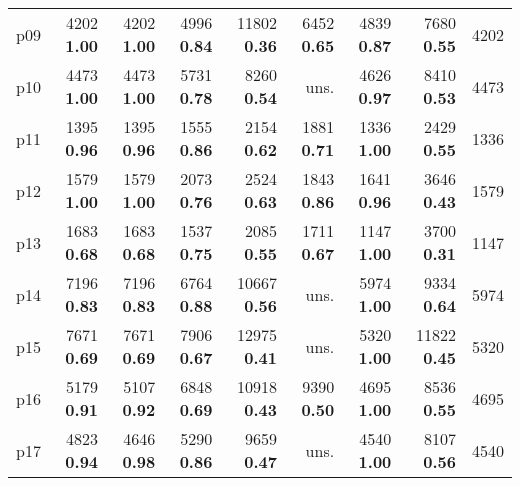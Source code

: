 \begin{tabular}{|l|rrrrrrr|r|}
p09 & {\footnotesize 4202} \textbf{1.00} & {\footnotesize 4202} \textbf{1.00} & {\footnotesize 4996} \textbf{0.84} & {\footnotesize 11802} \textbf{0.36} & {\footnotesize 6452} \textbf{0.65} & {\footnotesize 4839} \textbf{0.87} & {\footnotesize 7680} \textbf{0.55} & 4202\\
p10 & {\footnotesize 4473} \textbf{1.00} & {\footnotesize 4473} \textbf{1.00} & {\footnotesize 5731} \textbf{0.78} & {\footnotesize 8260} \textbf{0.54} & uns. & {\footnotesize 4626} \textbf{0.97} & {\footnotesize 8410} \textbf{0.53} & 4473\\
p11 & {\footnotesize 1395} \textbf{0.96} & {\footnotesize 1395} \textbf{0.96} & {\footnotesize 1555} \textbf{0.86} & {\footnotesize 2154} \textbf{0.62} & {\footnotesize 1881} \textbf{0.71} & {\footnotesize 1336} \textbf{1.00} & {\footnotesize 2429} \textbf{0.55} & 1336\\
p12 & {\footnotesize 1579} \textbf{1.00} & {\footnotesize 1579} \textbf{1.00} & {\footnotesize 2073} \textbf{0.76} & {\footnotesize 2524} \textbf{0.63} & {\footnotesize 1843} \textbf{0.86} & {\footnotesize 1641} \textbf{0.96} & {\footnotesize 3646} \textbf{0.43} & 1579\\
p13 & {\footnotesize 1683} \textbf{0.68} & {\footnotesize 1683} \textbf{0.68} & {\footnotesize 1537} \textbf{0.75} & {\footnotesize 2085} \textbf{0.55} & {\footnotesize 1711} \textbf{0.67} & {\footnotesize 1147} \textbf{1.00} & {\footnotesize 3700} \textbf{0.31} & 1147\\
p14 & {\footnotesize 7196} \textbf{0.83} & {\footnotesize 7196} \textbf{0.83} & {\footnotesize 6764} \textbf{0.88} & {\footnotesize 10667} \textbf{0.56} & uns. & {\footnotesize 5974} \textbf{1.00} & {\footnotesize 9334} \textbf{0.64} & 5974\\
p15 & {\footnotesize 7671} \textbf{0.69} & {\footnotesize 7671} \textbf{0.69} & {\footnotesize 7906} \textbf{0.67} & {\footnotesize 12975} \textbf{0.41} & uns. & {\footnotesize 5320} \textbf{1.00} & {\footnotesize 11822} \textbf{0.45} & 5320\\
p16 & {\footnotesize 5179} \textbf{0.91} & {\footnotesize 5107} \textbf{0.92} & {\footnotesize 6848} \textbf{0.69} & {\footnotesize 10918} \textbf{0.43} & {\footnotesize 9390} \textbf{0.50} & {\footnotesize 4695} \textbf{1.00} & {\footnotesize 8536} \textbf{0.55} & 4695\\
p17 & {\footnotesize 4823} \textbf{0.94} & {\footnotesize 4646} \textbf{0.98} & {\footnotesize 5290} \textbf{0.86} & {\footnotesize 9659} \textbf{0.47} & uns. & {\footnotesize 4540} \textbf{1.00} & {\footnotesize 8107} \textbf{0.56} & 4540\\

\end{tabular}
